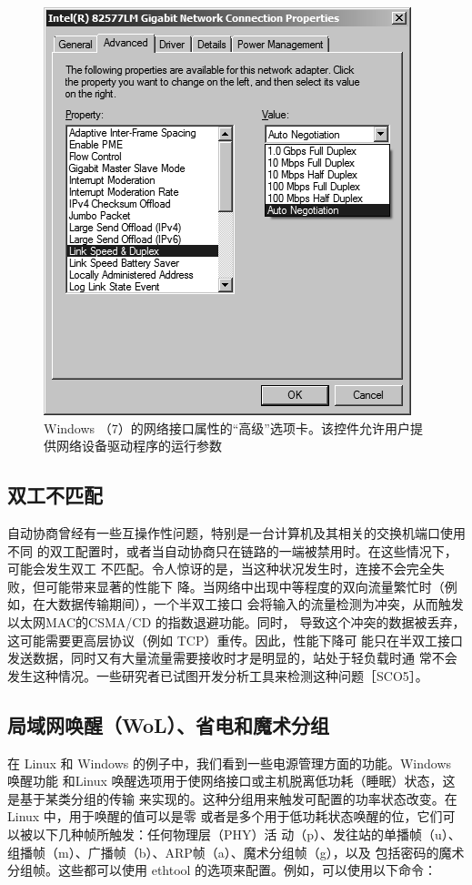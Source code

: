 \begin{figure}
    \centering
    \includegraphics[scale=0.5]{imgs/3/3-6.png}
    \caption{Windows （7）的网络接口属性的“高级”选项卡。该控件允许用户提供网络设备驱动程序的运行参数}
\end{figure}

\subsection{双工不匹配}

自动协商曾经有一些互操作性问题，特别是一台计算机及其相关的交换机端口使用不同
的双工配置时，或者当自动协商只在链路的一端被禁用时。在这些情况下，可能会发生双工
不匹配。令人惊讶的是，当这种状况发生时，连接不会完全失败，但可能带来显著的性能下
降。当网络中出现中等程度的双向流量繁忙时（例如，在大数据传输期间），一个半双工接口
会将输入的流量检测为冲突，从而触发以太网MAC的CSMA/CD 的指数退避功能。同时，
导致这个冲突的数据被丢弃，这可能需要更高层协议（例如 TCP）重传。因此，性能下降可
能只在半双工接口发送数据，同时又有大量流量需要接收时才是明显的，站处于轻负载时通
常不会发生这种情况。一些研究者已试图开发分析工具来检测这种问题［SCO5］。

\subsection{局域网唤醒（WoL）、省电和魔术分组}

在 Linux 和 Windows 的例子中，我们看到一些电源管理方面的功能。Windows 唤醒功能
和Linux 唤醒选项用于使网络接口或主机脱离低功耗（睡眠）状态，这是基于某类分组的传输
来实现的。这种分组用来触发可配置的功率状态改变。在Linux 中，用于唤醒的值可以是零
或者是多个用于低功耗状态唤醒的位，它们可以被以下几种帧所触发：任何物理层（PHY）活
动（p）、发往站的单播帧（u）、组播帧（m）、广播帧（b）、ARP帧（a）、魔术分组帧（g），以及
包括密码的魔术分组帧。这些都可以使用 ethtool 的选项来配置。例如，可以使用以下命令：

